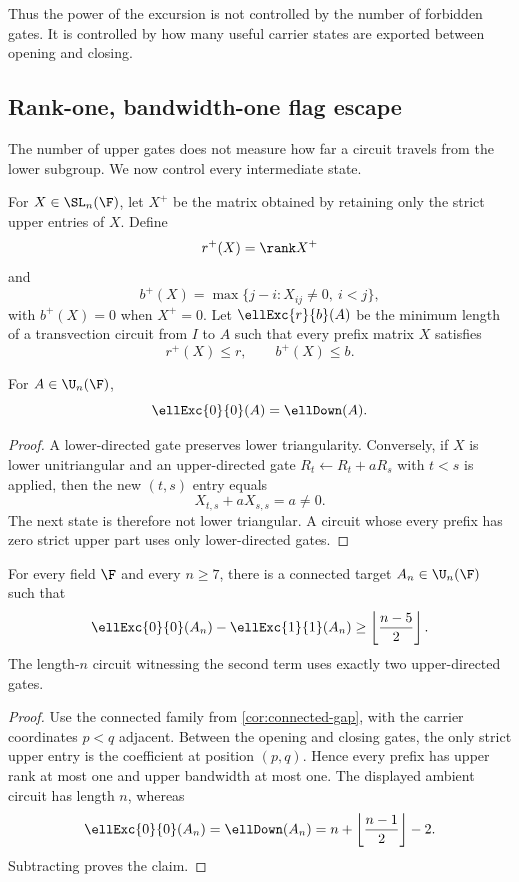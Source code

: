 Thus the power of the excursion is not controlled by the number of forbidden gates.  It is controlled by how many useful carrier states are exported between opening and closing.

\subsection{Rank-one, bandwidth-one flag escape}\label{subsec:microscopic-escape}

The number of upper gates does not measure how far a circuit travels from the lower subgroup.  We now control every intermediate state.

For $X\in\SL_n(\F)$, let $X^+$ be the matrix obtained by retaining only the strict upper entries of $X$.  Define
\[
r^+(X)=\rank X^+
\]
and
\[
b^+(X)=\max\{j-i:X_{ij}\ne0,\ i<j\},
\]
with $b^+(X)=0$ when $X^+=0$.  Let $\ellExc{r}{b}(A)$ be the minimum length of a transvection circuit from $I$ to $A$ such that every prefix matrix $X$ satisfies
\[
r^+(X)\le r,
\qquad
b^+(X)\le b.
\]

\begin{lemma}\label{lem:zero-excursion-equals-lower}
For $A\in\U_n(\F)$,
\[
\ellExc{0}{0}(A)=\ellDown(A).
\]
\end{lemma}

\begin{proof}
A lower-directed gate preserves lower triangularity.  Conversely, if $X$ is lower unitriangular and an upper-directed gate $R_t\leftarrow R_t+aR_s$ with $t<s$ is applied, then the new $(t,s)$ entry equals
\[
X_{t,s}+aX_{s,s}=a\ne0.
\]
The next state is therefore not lower triangular.  A circuit whose every prefix has zero strict upper part uses only lower-directed gates.
\end{proof}

\begin{theorem}\label{thm:microscopic-escape}
For every field $\F$ and every $n\ge7$, there is a connected target $A_n\in\U_n(\F)$ such that
\[
\ellExc{0}{0}(A_n)-\ellExc{1}{1}(A_n)
\ge
\left\lfloor\frac{n-5}{2}\right\rfloor.
\]
The length-$n$ circuit witnessing the second term uses exactly two upper-directed gates.
\end{theorem}

\begin{proof}
Use the connected family from \cref{cor:connected-gap}, with the carrier coordinates $p<q$ adjacent.  Between the opening and closing gates, the only strict upper entry is the coefficient at position $(p,q)$.  Hence every prefix has upper rank at most one and upper bandwidth at most one.  The displayed ambient circuit has length $n$, whereas
\[
\ellExc{0}{0}(A_n)=\ellDown(A_n)
=n+\left\lfloor\frac{n-1}{2}\right\rfloor-2.
\]
Subtracting proves the claim.
\end{proof}

